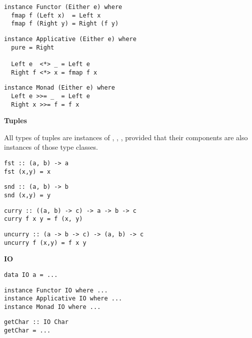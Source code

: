 \begin{multicols}{2}
\begin{verbatim}
instance Functor (Either e) where 
  fmap f (Left x)  = Left x
  fmap f (Right y) = Right (f y)
\end{verbatim}

\begin{verbatim}
instance Applicative (Either e) where 
  pure = Right
  
  Left e  <*> _ = Left e 
  Right f <*> x = fmap f x
\end{verbatim}

\begin{verbatim}
instance Monad (Either e) where 
  Left e >>= _  = Left e
  Right x >>= f = f x
\end{verbatim}
	
\textbf{\large Tuples}
	
All types of tuples are instances of , , ,  provided that their components are also instances of those type classes.
	
\begin{verbatim}
fst :: (a, b) -> a
fst (x,y) = x
\end{verbatim}

\begin{verbatim}
snd :: (a, b) -> b
snd (x,y) = y
\end{verbatim}

\begin{verbatim}
curry :: ((a, b) -> c) -> a -> b -> c 
curry f x y = f (x, y)
\end{verbatim}

\begin{verbatim}
uncurry :: (a -> b -> c) -> (a, b) -> c
uncurry f (x,y) = f x y
\end{verbatim}
	
\textbf{\large IO}\\
	
\begin{verbatim}
data IO a = ...
\end{verbatim}

\begin{verbatim}
instance Functor IO where ...
instance Applicative IO where ...
instance Monad IO where ...
\end{verbatim}

\begin{verbatim}
getChar :: IO Char
getChar = ...
\end{verbatim}


\end{multicols}
